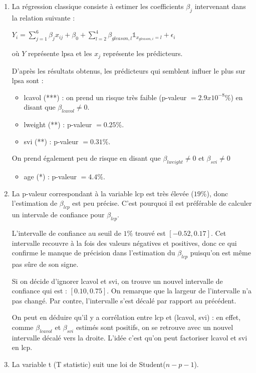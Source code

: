 \documentclass[a4paper, 12pt]{article}
\begin{document}
\begin{enumerate}
\item
La régression classique consiste à estimer les coefficients $\beta_{j}$ intervenant dans la relation suivante :

$ Y_{i} = \sum\limits_{j=1}^6 \beta_{j} x_{ij} + \beta_{0} + \sum\limits_{l=2}^4 \beta_{gleason, l} \mathds{1}_{x_{gleason, i}=l} + \epsilon_{i} $

où $Y$ représente lpsa et les $x_{j}$ représente les prédicteurs.  

D'après les résultats obtenus, les prédicteurs qui semblent influer le plus sur lpsa sont :
\begin{itemize}
\item lcavol (***) : on prend un risque très faible (p-valeur $=2.9x10^{-8}\%$) en disant que $\beta_{lcavol} \neq 0$.
\item lweight (**) : p-valeur $=0.25\%$.
\item svi (**) : p-valeur $=0.31\%$.
\end{itemize}
On prend également peu de risque en disant que $\beta_{lweight} \neq 0$ et $\beta_{svi} \neq 0$ 
\begin{itemize}
\item age (*) : p-valeur $=4.4\%$.
\end{itemize}

\item La p-valeur correspondant à la variable lcp est très élevée ($19\%$), donc l'estimation de $\beta_{lcp}$ est peu précise. C'est pourquoi il est préférable de calculer un intervale de confiance pour $\beta_{lcp}$.

L'intervalle de confiance au seuil de $1\%$ trouvé est $[-0.52, 0.17]$. Cet intervalle recouvre à la fois des valeurs négatives et positives, donc ce qui confirme le manque de précision dans l'estimation du $\beta_{lcp}$ puisqu'on est même pas sûre de son signe.

Si on décide d'ignorer lcavol et svi, on trouve un nouvel intervalle de confiance qui est : $[0.10, 0.75]$. On remarque que la largeur de l'intervalle n'a pas changé. Par contre, l'intervalle s'est décalé par rapport au précédent. 

On peut en déduire qu'il y a corrélation entre lcp et (lcavol, svi) : en effet, comme $\beta_{lcavol}$ et $\beta_{svi}$ estimés sont positifs, on se retrouve avec un nouvel intervalle décalé vers la droite. L'idée c'est qu'on peut factoriser lcavol et svi en lcp.

\item La variable t (T statistic) suit une loi de Student($n-p-1$).


\end{enumerate}
\end{document}
